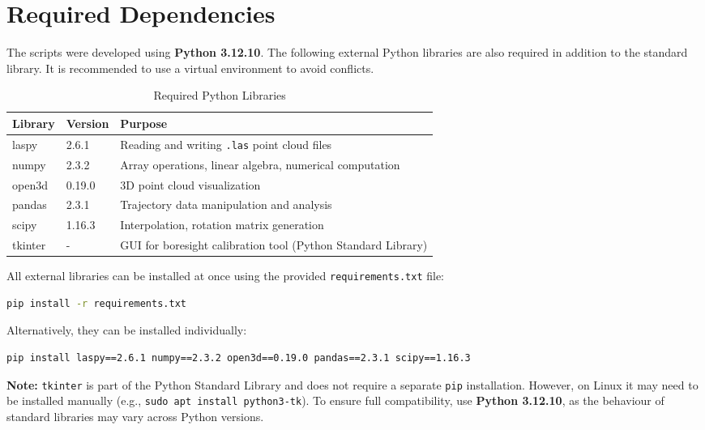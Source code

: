 \chapter{Required Dependencies}

The scripts were developed using \textbf{Python 3.12.10}. The following external Python libraries are also required in addition to the standard library. It is recommended to use a virtual environment to avoid conflicts.

\begin{table}[ht!]
    \centering
    \begin{tabular}{lll}
        \toprule
        Library & Version & Purpose                                                      \\ \midrule
        laspy   & 2.6.1   & Reading and writing \texttt{.las} point cloud files          \\
        numpy   & 2.3.2   & Array operations, linear algebra, numerical computation      \\
        open3d  & 0.19.0  & 3D point cloud visualization                                 \\
        pandas  & 2.3.1   & Trajectory data manipulation and analysis                    \\
        scipy   & 1.16.3  & Interpolation, rotation matrix generation                    \\
        tkinter & -       & GUI for boresight calibration tool (Python Standard Library) \\ \bottomrule
    \end{tabular}
    \caption{Required Python Libraries}
\end{table}

All external libraries can be installed at once using the provided \texttt{requirements.txt} file:

\begin{lstlisting}[language=bash,numbers=none]
pip install -r requirements.txt
\end{lstlisting}

Alternatively, they can be installed individually:

\begin{lstlisting}[language=bash,numbers=none]
pip install laspy==2.6.1 numpy==2.3.2 open3d==0.19.0 pandas==2.3.1 scipy==1.16.3
\end{lstlisting}

\textbf{Note:} \texttt{tkinter} is part of the Python Standard Library and does not require a separate \texttt{pip} installation. However, on Linux it may need to be installed manually (e.g., \texttt{sudo apt install python3-tk}). To ensure full compatibility, use \textbf{Python 3.12.10}, as the behaviour of standard libraries may vary across Python versions.

